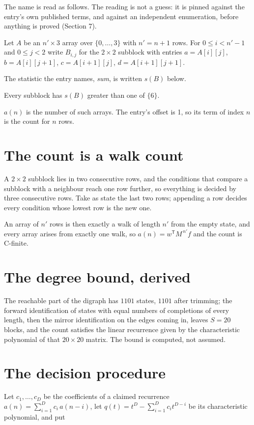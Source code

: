 \documentclass[11pt]{article}
\theoremstyle{definition}
\begin{document}
The name is read as follows. The reading is not a guess: it is pinned against the entry's own published terms, and against an independent enumeration, before anything is proved (Section 7).

Let $A$ be an $n' \times 3$ array over $\{0,\dots,3\}$ with $n' = n + 1$ rows. For $0 \le i < n'-1$ and $0 \le j < 2$ write $B_{i,j}$ for the $2\times2$ subblock with entries $a = A[i][j]$, $b = A[i][j{+}1]$, $c = A[i{+}1][j]$, $d = A[i{+}1][j{+}1]$.

The statistic the entry names, {\itshape sum}, is written $s(B)$ below.

Every subblock has $s(B)$ greater than one of $\{6\}$.

$a(n)$ is the number of such arrays. The entry's offset is 1, so its term of index $n$ is the count for $n$ rows.

\section{The count is a walk count}

A $2\times2$ subblock lies in two consecutive rows, and the conditions that compare a subblock with a neighbour reach one row further, so everything is decided by three consecutive rows. Take as state the last two rows; appending a row decides every condition whose lowest row is the new one.

An array of $n'$ rows is then exactly a walk of length $n'$ from the empty state, and every array arises from exactly one walk, so $a(n) = w^{\mathsf T}M^{\,n'}f$ and the count is C-finite.

\section{The degree bound, derived}

The reachable part of the digraph has $1101$ states, $1101$ after trimming; the forward identification of states with equal numbers of completions of every length, then the mirror identification on the edges coming in, leaves $S = 20$ blocks, and the count satisfies the linear recurrence given by the characteristic polynomial of that $20\times20$ matrix. The bound is computed, not assumed.

\section{The decision procedure}

Let $c_1,\dots,c_D$ be the coefficients of a claimed recurrence $a(n) = \sum_{i=1}^{D} c_i\,a(n-i)$, let $q(t) = t^{D} - \sum_{i=1}^{D} c_i t^{D-i}$ be its characteristic polynomial, and put
\end{document}
